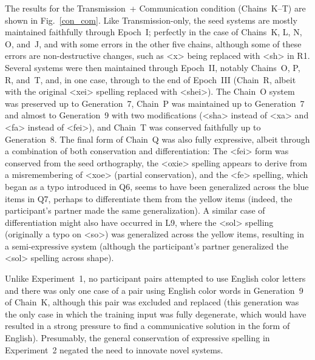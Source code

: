 \documentclass[doc,biblatex]{apa7}
\begin{document}
The results for the Transmission~+ Communication condition (Chains~K--T) are shown in Fig.~\ref{con_com}. Like Transmission-only, the seed systems are mostly maintained faithfully through Epoch~I; perfectly in the case of Chains~K, L, N, O, and~J, and with some errors in the other five chains, although some of these errors are non-destructive changes, such as <x> being replaced with <sh> in R1. Several systems were then maintained through Epoch~II, notably Chains~O, P, R, and~T, and, in one case, through to the end of Epoch~III (Chain~R, albeit with the original <xei> spelling replaced with <shei>). The Chain~O system was preserved up to Generation~7, Chain~P was maintained up to Generation~7 and almost to Generation~9 with two modifications (<sha> instead of <xa> and <fa> instead of <fei>), and Chain~T was conserved faithfully up to Generation~8. The final form of Chain~Q was also fully expressive, albeit through a combination of both conservation and differentiation: The <fei> form was conserved from the seed orthography, the <oxie> spelling appears to derive from a misremembering of <xoe> (partial conservation), and the <fe> spelling, which began as a typo introduced in Q6, seems to have been generalized across the blue items in Q7, perhaps to differentiate them from the yellow items (indeed, the participant's partner made the same generalization). A similar case of differentiation might also have occurred in L9, where the <sol> spelling (originally a typo on <so>) was generalized across the yellow items, resulting in a semi-expressive system (although the participant's partner generalized the <sol> spelling across shape).

Unlike Experiment~1, no participant pairs attempted to use English color letters and there was only one case of a pair using English color words in Generation~9 of Chain~K, although this pair was excluded and replaced (this generation was the only case in which the training input was fully degenerate, which would have resulted in a strong pressure to find a communicative solution in the form of English). Presumably, the general conservation of expressive spelling in Experiment~2 negated the need to innovate novel systems.
\end{document}
